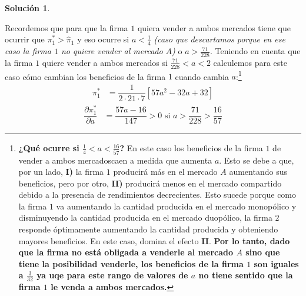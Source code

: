 \documentclass[a4paper, 11pt]{article}
\theoremstyle{definition}
\newtheorem{solucion}{Soluci\'on}
\begin{document}
\begin{solucion}
\begin{enumerate}[label=(\alph*)]
\begin{enumerate}[label=\roman*.]
 Recordemos que para que la firma $1$ quiera vender a ambos mercados tiene que ocurrir que $\pi_1^*>\hat{\pi}_1$ y eso ocurre si $a<\frac{1}{4}$ \textit{(caso que descartamos porque en ese caso la firma $1$ no quiere vender al mercado $A$)} o $a>\frac{71}{228}$. Teniendo en cuenta que la firma $1$ quiere vender a ambos mercados si $\frac{71}{228}<a<2$ calculemos para este caso cómo cambian los beneficios de la firma $1$ cuando cambia $a$:\footnote{\textbf{¿Qué ocurre si $\frac{1}{4}<a<\frac{16}{57}$?} En este caso los beneficios de la firma $1$ de vender a ambos mercadoscaen a medida que aumenta $a$. Esto se debe a que, por un lado, \textbf{I)} la firma $1$ producirá más en el mercado $A$ aumentando sus beneficios, pero por otro, \textbf{II)} producirá menos en el mercado compartido debido a la presencia de rendimientos decrecientes. Esto sucede porque como la firma $1$ va aumentando la cantidad producida en el mercado monopólico y disminuyendo la cantidad producida en el mercado duopólico, la firma $2$ responde óptimamente aumentando la cantidad producida y obteniendo mayores beneficios. En este caso, domina el efecto \textbf{II}. \textbf{Por lo tanto, dado que la firma no está obligada a venderle al mercado $A$ sino que tiene la posibilidad venderle, los beneficios de la firma $1$ son iguales a $\frac{3}{32}$ ya uqe para este rango de valores de $a$ no tiene sentido que la firma $1$ le venda a ambos mercados.}}
 \vspace*{-8pt}
 \begin{align*}
 \pi_1^*&=\dfrac{1}{2\cdot21\cdot7}[57a^2-32a+32]\end{align*}
 \begin{align*}
 \dfrac{\partial\pi_1^*}{\partial a}&= \dfrac{57a-16}{147}>0 \text{ si } a>\dfrac{71}{228}>\dfrac{16}{57}
 \end{align*}
\vspace*{-8pt}


\end{enumerate}
\end{enumerate}
\end{solucion}
\end{document}
